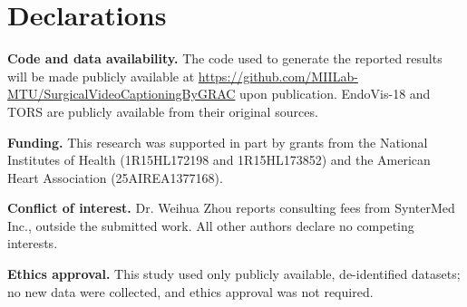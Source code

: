 \documentclass[11pt]{article}
\begin{document}
\section*{Declarations}

\noindent\textbf{Code and data availability.} The code used to generate the reported results will be made publicly available at \url{https://github.com/MIILab-MTU/SurgicalVideoCaptioningByGRAC} upon publication. EndoVis-18 and TORS are publicly available from their original sources.

\noindent\textbf{Funding.} This research was supported in part by grants from the National Institutes of Health (1R15HL172198 and 1R15HL173852) and the American Heart Association (25AIREA1377168).

\noindent\textbf{Conflict of interest.} Dr. Weihua Zhou reports consulting fees from SynterMed Inc., outside the submitted work. All other authors declare no competing interests.

\noindent\textbf{Ethics approval.} This study used only publicly available, de-identified datasets; no new data were collected, and ethics approval was not required.
\end{document}
